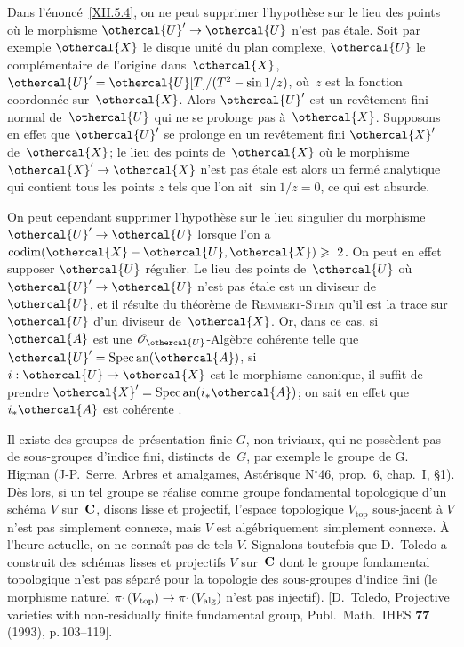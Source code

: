 \begin{remarque}
\label{XII.5.5}
Dans l'\'enonc\'e~\ref{XII.5.4}, on ne peut supprimer
l'hypoth\`ese sur le lieu des points o\`u le morphisme
$\othercal{U}'\to\othercal{U}$ n'est pas \'etale. Soit par exemple
$\othercal{X}$ le disque unit\'e du plan complexe, $\othercal{U}$ le
compl\'ementaire de l'origine dans~$\othercal{X}$,
$\othercal{U}'=\othercal{U}[T]/(T^2-\sin 1/z)$, o\`u~$z$ est la fonction
coordonn\'ee sur~$\othercal{X}$. Alors $\othercal{U}'$ est un rev\^etement
fini normal de~$\othercal{U}$ qui ne se prolonge pas
\`a~$\othercal{X}$. Supposons en effet que $\othercal{U}'$ se prolonge en un
rev\^etement fini $\othercal{X}'$ de~$\othercal{X}$; le lieu des points
de~$\othercal{X}$ o\`u le morphisme $\othercal{X}'\to\othercal{X}$ n'est pas
\'etale est alors un ferm\'e analytique qui contient tous les
points $z$ tels que l'on ait $\sin 1/z=0$, ce qui est absurde.

On peut cependant supprimer l'hypoth\`ese sur le lieu singulier du
morphisme $\othercal{U}'\to\othercal{U}$ lorsque l'on a
$\codim(\othercal{X}-\othercal{U},\othercal{X})\geq~2$. On peut en effet supposer
$\othercal{U}$ r\'egulier. Le lieu des points de~$\othercal{U}$ o\`u
$\othercal{U}'\to\othercal{U}$ n'est pas \'etale est un diviseur
de~$\othercal{U}$, et il r\'esulte du th\'eor\`eme de \textsc{Remmert}-\textsc{Stein}
\cite[th.\, 3]{XII.9} qu'il est
la trace sur~$\othercal{U}$ d'un diviseur de~$\othercal{X}$. Or, dans ce cas,
si $\othercal{A}$ est une $\cal{O}_{\othercal{U}}$-Alg\`ebre coh\'erente
telle que $\othercal{U}'=\Spec \an(\othercal{A})$, si $i:\othercal{U}\to\othercal{X}$
est le morphisme canonique, il suffit de prendre
$\othercal{X}'=\Spec\an(i_*\othercal{A})$; on sait en effet que $i_*\othercal{A}$
est
coh\'erente
\cite[ th.\, 1]{XII.11}.
\end{remarque}

\begin{remarqueMR}
\label{XII.5.6}
Il existe des groupes de pr\'esentation finie $G$, non
triviaux, qui ne poss\`edent pas de sous-groupes d'indice fini,
distincts de~$G$, par exemple le groupe de G.\, Higman (\cf J-P.\, Serre, Arbres et amalgames, Ast\'erisque N$^\circ$46, prop.\, 6, chap.\, I, \S 1).
D\`es lors, si un tel groupe se r\'ealise comme groupe fondamental
topologique d'un sch\'ema $V$ sur~$\mathbf{C}$, disons lisse et
projectif, l'espace topologique $V_{\mathrm{top}}$ sous-jacent \`a $V$ n'est pas
simplement connexe, mais $V$ est alg\'ebriquement simplement connexe.
\`A l'heure actuelle, on ne conna\^it pas de tels $V$. Signalons toutefois
que D.\, Toledo a construit des sch\'emas lisses et projectifs $V$ sur~$\mathbf{C}$ dont le groupe fondamental topologique n'est pas s\'epar\'e
pour la topologie des sous-groupes d'indice fini (le morphisme naturel
$\pi_1(V_{\mathrm{top}})\to\pi_1(V_{\alg})$ n'est pas injectif). [D.\, Toledo, Projective varieties with non-residually finite fundamental group, Publ.\ Math.\ IHES \textbf{77} (1993), p.\,103--119].
\end{remarqueMR}


